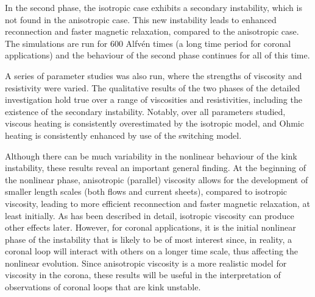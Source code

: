 In the second phase, the isotropic case exhibits a secondary instability, which is not found in the anisotropic case. This new instability leads to enhanced reconnection and faster magnetic relaxation, compared to the anisotropic case.  The simulations are run for $600$ Alfv\'en times (a long time period for coronal applications) and the behaviour of the second phase continues for all of this time.

A series of parameter studies was also run, where the strengths of viscosity and resistivity were varied. The qualitative results of the two phases of the detailed investigation hold true over a range of viscosities and resistivities, including the existence of the secondary instability. Notably, over all parameters studied, viscous heating is consistently overestimated by the isotropic model, and Ohmic heating is consistently enhanced by use of the switching model.

Although there can be much variability in the nonlinear behaviour of the kink instability, these results reveal an important general finding. At the beginning of the nonlinear phase, anisotropic (parallel) viscosity allows for the development of smaller length scales (both flows and current sheets), compared to isotropic viscosity, leading to more efficient reconnection and faster magnetic relaxation, at least initially. As has been described in detail, isotropic viscosity can produce other effects later. However, for coronal applications, it is the initial nonlinear phase of the instability that is likely to be of most interest since, in reality, a coronal loop will interact with others on a longer time scale, thus affecting the nonlinear evolution. Since anisotropic viscosity is a more realistic model for viscosity in the corona, these results will be useful in the interpretation of observations of coronal loops that are kink unstable.
